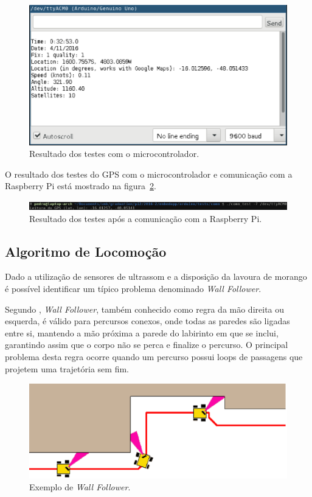 	\begin{figure}[!htbp]
	\begin{center}
	\includegraphics[width=.7\textwidth]{figuras/gps_arduino.eps}
	\caption{\label{fig:gpsardu}Resultado dos testes com o microcontrolador.}
	\end{center}
	\end{figure}

	O resultado dos testes do GPS com o microcontrolador e comunicação com a
	Raspberry Pi está mostrado na figura~\ref{fig:gpsrasp}.

	\begin{figure}[!htbp]
	\begin{center}
	\includegraphics[width=\textwidth]{figuras/gps_raspberry.eps}
	\caption{\label{fig:gpsrasp}Resultado dos testes após a comunicação com a Raspberry Pi.}
	\end{center}
	\end{figure}


  \subsection{Algoritmo de Locomoção}
    Dado a utilização de sensores de ultrassom e a disposição da lavoura de morango
    é possível identificar um típico problema denominado \textit{Wall Follower}.

    Segundo \cite{huang2009}, \textit{Wall Follower},
    também conhecido como regra da mão direita ou esquerda, é válido para percursos conexos, onde todas as paredes são ligadas entre si, mantendo a mão próxima a parede do labirinto em
    que se inclui, garantindo assim que o corpo não se perca e finalize
    o percurso. O principal problema desta regra ocorre quando um percurso
    possui loops de passagens que projetem uma trajetória sem fim.

    \begin{figure}[!htbp]
    \begin{center}
    \includegraphics[width=.7\textwidth]{figuras/wallfollower.eps}
    \caption{\label{fig:wallfollower}Exemplo de \textit{Wall Follower}.}
    \end{center}
    \end{figure}

